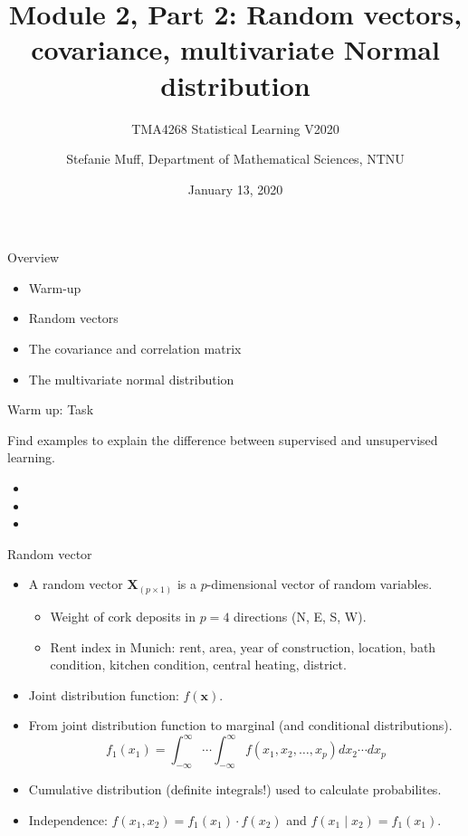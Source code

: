 \documentclass[ignorenonframetext,]{beamer}
\title{Module 2, Part 2: Random vectors, covariance, multivariate Normal
distribution}
\subtitle{TMA4268 Statistical Learning V2020}
\author{Stefanie Muff, Department of Mathematical Sciences, NTNU}
\date{January 13, 2020}
\providecommand{\tightlist}{%
  \setlength{\itemsep}{0pt}\setlength{\parskip}{0pt}}
\begin{document}
\frame{\titlepage}

\begin{frame}{Overview}

\normalsize

\begin{itemize}
\item
  Warm-up \vspace{2mm}
\item
  Random vectors \vspace{2mm}
\item
  The covariance and correlation matrix \vspace{2mm}
\item
  The multivariate normal distribution
\end{itemize}

\end{frame}

\begin{frame}{Warm up: Task}

Find examples to explain the difference between supervised and
unsupervised learning.

\begin{itemize}
\item
\item
\item
\end{itemize}

\end{frame}

\begin{frame}{Random vector}

\begin{itemize}
\tightlist
\item
  A random vector \(\boldsymbol{X}_{(p\times 1)}\) is a
  \(p\)-dimensional vector of random variables.

  \begin{itemize}
  \tightlist
  \item
    Weight of cork deposits in \(p=4\) directions (N, E, S, W).
  \item
    Rent index in Munich: rent, area, year of construction, location,
    bath condition, kitchen condition, central heating, district.
  \end{itemize}
\item
  Joint distribution function: \(f(\boldsymbol{x})\).
\item
  From joint distribution function to marginal (and conditional
  distributions).
  \[f_1(x_1)=\int_{-\infty}^{\infty}\cdots \int_{-\infty}^{\infty} f(x_1,x_2,\ldots,x_p)dx_2 \cdots dx_p\]
\item
  Cumulative distribution (definite integrals!) used to calculate
  probabilites.
\item
  Independence: \(f(x_1,x_2)=f_1(x_1)\cdot f(x_2)\) and
  \(f(x_1\mid x_2)=f_1(x_1).\)
\end{itemize}

\end{frame}
\end{document}
